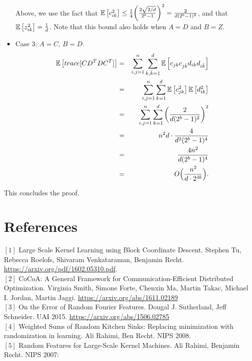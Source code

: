 \documentclass[12pt]{article}
\newcommand{\sq}{\sqrt{2}}
\newcommand{\hk}{\hat{k}}
\newcommand{\teps}{\tilde{\epsilon}}
\newcommand{\tS}{\tilde{S}}
\begin{document}
\begin{itemize}
\begin{eqnarray*}
\end{eqnarray*}
Above, we use the fact that $\expect{}{c_{ik}^2} \leq \frac{1}{4}\bigg(\frac{2\sqrt{2/d}}{2^b-1}\bigg)^2 = \frac{2}{d(2^b-1)^2}$, and that $\expect{}{z_{ik}^2} = \frac{1}{d}$.  Note that this bound also holds when $A=D$ and $B=Z$.
\item Case 3: $A=C$, $B=D$.
\begin{eqnarray*}
\expect{}{trace[CD^TDC^T]} &=& \sum_{i,j=1}^n \sum_{k,\hk=1}^d \expect{}{c_{jk}c_{j\hk}d_{ik}d_{i\hk}}\\
&=& \sum_{i,j=1}^n \sum_{k=1}^d \expect{}{c_{jk}^2}\expect{}{d_{ik}^2}\\
&=& \sum_{i,j=1}^n \sum_{k=1}^d \bigg(\frac{2}{d(2^b-1)^2}\bigg)^2\\
&=& n^2d \cdot\frac{4}{d^2(2^b-1)^4}\\
&=& \frac{4n^2}{d(2^b-1)^4}\\
&=& O\Big(\frac{n^2}{d \cdot 2^{4b}}\Big).
\end{eqnarray*}
\end{itemize}
This concludes the proof.


\section{References}
\noindent$[1]$ Large Scale Kernel Learning using Block Coordinate Descent.
Stephen Tu, Rebecca Roelofs, Shivaram Venkataraman, Benjamin Recht. \url{https://arxiv.org/pdf/1602.05310.pdf}. \\
$[2]$ CoCoA: A General Framework for Communication-Efficient Distributed Optimization.
Virginia Smith, Simone Forte, Chenxin Ma, Martin Takac, Michael I. Jordan, Martin Jaggi.  \url{https://arxiv.org/abs/1611.02189} \\
$[3]$ On the Error of Random Fourier Features. Dougal J. Sutherland, Jeff Schneider. UAI 2015. \url{https://arxiv.org/abs/1506.02785}\\
$[4]$ Weighted Sums of Random Kitchen Sinks: Replacing minimization with randomization in learning. Ali Rahimi, Ben Recht. NIPS 2008.\\
$[5]$	Random Features for Large-Scale Kernel Machines. Ali Rahimi, Benjamin Recht. NIPS 2007:
\end{document}

